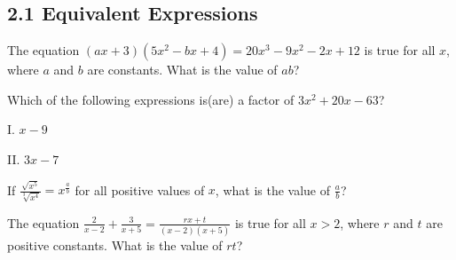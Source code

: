 \subsection*{2.1 Equivalent Expressions}


\noindent\markforreview
\vspace{1em}

The equation \((ax + 3)(5x^2 - bx + 4) = 20x^3 - 9x^2 - 2x + 12\) is true for all \(x\), where \(a\) and \(b\) are constants. What is the value of \(ab\)?

\vspace{0.75em}



\vspace{2em}

\noindent\markforreview
\vspace{1em}

Which of the following expressions is(are) a factor of \(3x^2 + 20x - 63\)?

I. \(x - 9\)  

II. \(3x - 7\)

\vspace{0.75em}



\vspace{2em}


\noindent\markforreview
\vspace{1em}

If \(\frac{\sqrt{x^5} }{\sqrt[3]{x^4}}  = x^{\frac{a}{b}}\) for all positive values of \(x\), what is the value of \(\frac{a}{b}\)?



\newpage
\noindent\markforreview
\vspace{1em}

The equation \(\frac{2}{x-2} + \frac{3}{x+5} = \frac{rx + t}{(x-2)(x+5)}\) is true for all \(x > 2\), where \(r\) and \(t\) are positive constants. What is the value of \(rt\)?

\vspace{0.75em}


\vspace{2em}
\noindent\markforreview
\vspace{1em}

